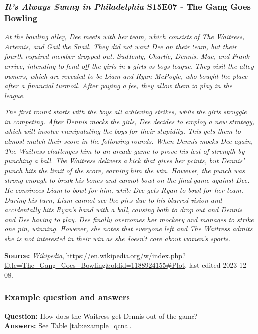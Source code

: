 \documentclass[11pt]{article}
\begin{document}
\subsubsection{\textit{It's Always Sunny in Philadelphia} S15E07 - The Gang Goes Bowling}

\textit{At the bowling alley, Dee meets with her team, which consists of The Waitress, Artemis, and Gail the Snail. They did not want Dee on their team, but their fourth required member dropped out. Suddenly, Charlie, Dennis, Mac, and Frank arrive, intending to fend off the girls in a girls vs boys league. They visit the alley owners, which are revealed to be Liam and Ryan McPoyle, who bought the place after a financial turmoil. After paying a fee, they allow them to play in the league.}

\textit{The first round starts with the boys all achieving strikes, while the girls struggle in competing. After Dennis mocks the girls, Dee decides to employ a new strategy, which will involve manipulating the boys for their stupidity. This gets them to almost match their score in the following rounds. When Dennis mocks Dee again, The Waitress challenges him to an arcade game to prove his test of strength by punching a ball. The Waitress delivers a kick that gives her points, but Dennis' punch hits the limit of the score, earning him the win. However, the punch was strong enough to break his bones and cannot bowl on the final game against Dee. He convinces Liam to bowl for him, while Dee gets Ryan to bowl for her team. During his turn, Liam cannot see the pins due to his blurred vision and accidentally hits Ryan's hand with a ball, causing both to drop out and Dennis and Dee having to play. Dee finally overcomes her mockery and manages to strike one pin, winning. However, she notes that everyone left and The Waitress admits she is not interested in their win as she doesn't care about women's sports.}

\textbf{Source:} \emph{Wikipedia}, \url{https://en.wikipedia.org/w/index.php?title=The_Gang_Goes_Bowling&oldid=1188924155#Plot}, last edited 2023-12-08.

\subsubsection{Example question and answers}

\textbf{Question:} How does the Waitress get Dennis out of the game? \\
\textbf{Answers:} See Table \ref{tab:example_qcna}.
\end{document}
